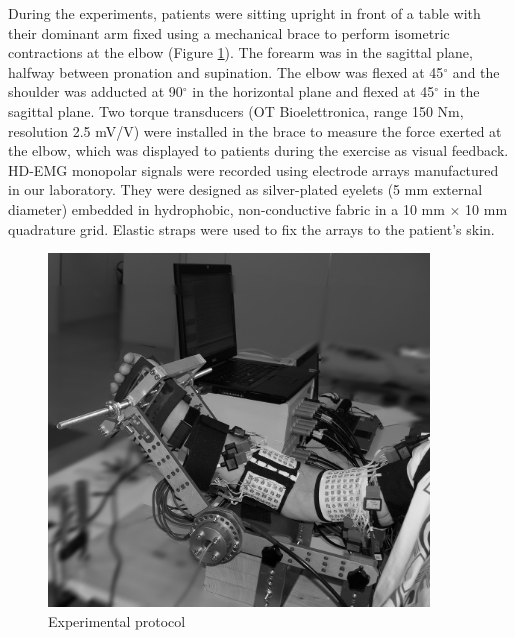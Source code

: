 During the experiments, patients were sitting upright in front of a table with their dominant arm fixed using a mechanical brace to perform isometric contractions at the elbow (Figure \ref{fig:2-1}). The forearm was in the sagittal plane, halfway between pronation and supination. The elbow was flexed at 45$^{\circ}$ and the shoulder was adducted at 90$^{\circ}$ in the horizontal plane and flexed at 45$^{\circ}$ in the sagittal plane. Two torque transducers (OT Bioelettronica, range 150 Nm, resolution 2.5 mV/V) were installed in the brace to measure the force exerted at the elbow, which was displayed to patients during the exercise as visual feedback.
HD-EMG monopolar signals were recorded using electrode arrays manufactured in our laboratory. They were designed as silver-plated eyelets (5 mm external diameter) embedded in hydrophobic, non-conductive fabric in a 10 mm $\times$ 10 mm quadrature grid. Elastic straps were used to fix the arrays to the patient’s skin.

\begin{figure}[ht]
\centering
\includegraphics[width=0.9\textwidth]{Images/figure2_1.png}
\caption{Experimental protocol
}
\label{fig:2-1}
\end{figure}      



